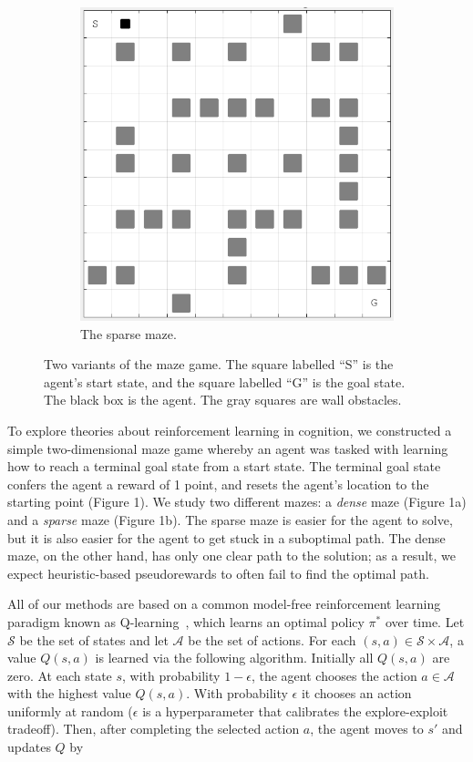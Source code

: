 \documentclass[notitlepage]{article}
\begin{document}
\begin{figure}
\begin{subfigure}{.4\textwidth}
  \includegraphics[width=.95\linewidth]{sparse_maze}
  \caption{The sparse maze.}
\end{subfigure}
\caption{Two variants of the maze game. The square labelled ``S'' is the agent's start state, and the square labelled ``G'' is the goal state. The black box is the agent. The gray squares are wall obstacles.}
\label{fig:mazes}
\end{figure}

To explore theories about reinforcement learning in cognition, we constructed a simple two-dimensional maze game whereby an agent was tasked with learning how to reach a terminal goal state from a start state. The terminal goal state confers the agent a reward of 1 point, and resets the agent's location to the starting point (Figure 1). We study two different mazes: a \textit{dense} maze (Figure 1a) and a \textit{sparse} maze (Figure 1b). The sparse maze is easier for the agent to solve, but it is also easier for the agent to get stuck in a suboptimal path. The dense maze, on the other hand, has only one clear path to the solution; as a result, we expect heuristic-based pseudorewards to often fail to find the optimal path.

All of our methods are based on a common model-free reinforcement learning paradigm known as Q-learning~\cite{sutton1998reinforcement}, which learns an optimal policy $\pi^*$ over time. Let $\mathcal{S}$ be the set of states and let $\mathcal{A}$ be the set of actions. For each $(s,a) \in \mathcal{S} \times \mathcal{A}$, a value $Q(s,a)$ is learned via the following algorithm. Initially all $Q(s,a)$ are zero. At each state $s$, with probability $1 - \epsilon$, the agent chooses the action $a \in \mathcal{A}$ with the highest value $Q(s,a)$. With probability $\epsilon$ it chooses an action uniformly at random ($\epsilon$ is a hyperparameter that calibrates the explore-exploit tradeoff). Then, after completing the selected action $a$, the agent moves to $s'$ and updates $Q$ by
\end{document}
